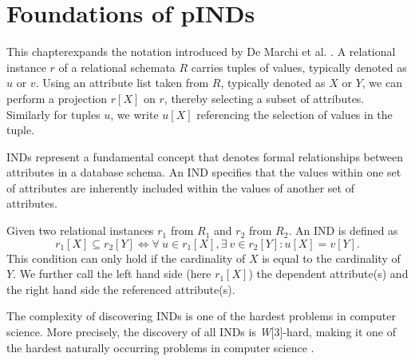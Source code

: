 \chapter{Foundations of pINDs}\label{sec:foundations}
This chapterexpands the notation introduced by De Marchi et al. \cite{marchi2009unary}. A relational instance $r$ of a relational schemata $R$ carries tuples of values, typically denoted as $u$ or $v$. Using an attribute list taken from $R$, typically denoted as $X$ or $Y$, we can perform a projection $r[X]$ on $r$, thereby selecting a subset of attributes. Similarly for tuples $u$, we write $u[X]$ referencing the selection of values in the tuple.

INDs represent a fundamental concept that denotes formal relationships between attributes in a database schema. An IND specifies that the values within one set of attributes are inherently included within the values of another set of attributes.
\begin{definition}\label{def:inds}
    Given two relational instances $r_1$ from $R_1$ and $r_2$ from $R_2$. An IND is defined as $$r_1[X] \subseteq r_2[Y] \iff \forall \: u \in r_1[X], \exists \: v \in r_2[Y] : u[X] = v[Y].$$ This condition can only hold if the cardinality of $X$ is equal to the cardinality of $Y$. We further call the left hand side (here $r_1[X]$) the dependent attribute(s) and the right hand side the referenced attribute(s).
\end{definition}
The complexity of discovering INDs is one of the hardest problems in computer science. More precisely, the discovery of all INDs is \textit{W}[3]-hard, making it one of the hardest naturally occurring problems in computer science \cite{blasius2017parameterized}. 


